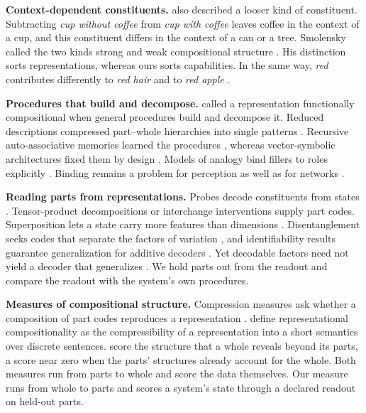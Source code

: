 \textbf{Context-dependent constituents.} \citet{smolensky1988} also described a looser kind of constituent. Subtracting \emph{cup without coffee} from \emph{cup with coffee} leaves coffee in the context of a cup, and this constituent differs in the context of a can or a tree. Smolensky called the two kinds strong and weak compositional structure \citep{smolensky1987}. His distinction sorts representations, whereas ours sorts capabilities. In the same way, \emph{red} contributes differently to \emph{red hair} and to \emph{red apple} \citep{kamp1995}.

\textbf{Procedures that build and decompose.} \citet{vangelder1990} called a representation functionally compositional when general procedures build and decompose it. Reduced descriptions compressed part--whole hierarchies into single patterns \citep{hinton1990}. Recursive auto-associative memories learned the procedures \citep{pollack1990}, whereas vector-symbolic architectures fixed them by design \citep{plate1995,gayler2006,kanerva2009}. Models of analogy bind fillers to roles explicitly \citep{hummel1997}. Binding remains a problem for perception as well as for networks \citep{treisman1980,greff2020}.

\textbf{Reading parts from representations.} Probes decode constituents from states \citep{belinkov2022}. Tensor-product decompositions \citep{mccoy2019} or interchange interventions \citep{geiger2021} supply part codes. Superposition lets a state carry more features than dimensions \citep{elhage2022}. Disentanglement seeks codes that separate the factors of variation \citep{bengio2013,locatello2019}, and identifiability results guarantee generalization for additive decoders \citep{lachapelle2023,wiedemer2024}. Yet decodable factors need not yield a decoder that generalizes \citep{montero2021}. We hold parts out from the readout and compare the readout with the system's own procedures.

\textbf{Measures of compositional structure.} Compression measures ask whether a composition of part codes reproduces a representation \citep{andreas2019}. \citet{elmoznino2024} define representational compositionality as the compressibility of a representation into a short semantics over discrete sentences. \citet{elmoznino2026} score the structure that a whole reveals beyond its parts, a score near zero when the parts' structures already account for the whole. Both measures run from parts to whole and score the data themselves. Our measure runs from whole to parts and scores a system's state through a declared readout on held-out parts.

